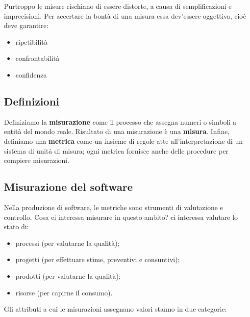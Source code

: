 \documentclass[a4paper]{article}
\begin{document}
Purtroppo le misure rischiano di essere distorte, a causa di semplificazioni e imprecisioni. Per accertare la bontà di una misura essa dev'essere oggettiva, cioè deve garantire:
		
	\begin{itemize}
		
			
	\item ripetibilità
			
	\item confrontabilità
			
	\item confidenza
		
	\end{itemize}


		
	\subsection{Definizioni}

		
Definiziamo la \textbf{misurazione} come il processo che assegna numeri o simboli a entità del mondo reale. Risultato di una misurazione è una \textbf{misura}. Infine, definiamo una \textbf{metrica} come un insieme di regole atte all'interpretazione di un sistema di unità di misura; ogni metrica fornisce anche delle procedure per compiere misurazioni.

		
	\subsection{Misurazione del software}

		
Nella produzione di software, le metriche sono strumenti di valutazione e controllo. Cosa ci interessa misurare in questo ambito? ci interessa valutare lo stato di:
		
	\begin{itemize}
		
			
	\item processi (per valutarne la qualità);
			
	\item progetti (per effettuare stime, preventivi e consuntivi);
			
	\item prodotti (per valutarne la qualità);
			
	\item risorse (per capirne il consumo).
		
	\end{itemize}

		
Gli attributi a cui le misurazioni assegnano valori stanno in due categorie:
		
\end{document}
